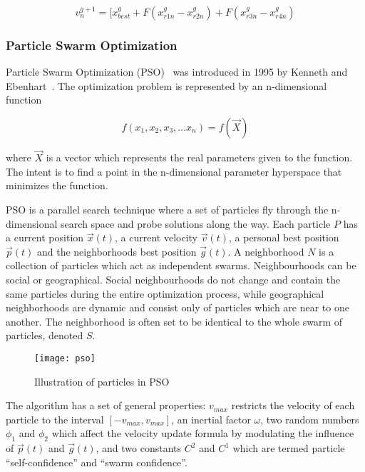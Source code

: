 \begin{equation}
v_{n}^{g+1} = [ x_{best}^{g} + F(x_{r1n}^{g} - x_{r2n}^{g}) + F(x_{r3n}^{g} - x_{r4n}^{g})
\end{equation}

\subsubsection{Particle Swarm Optimization}

Particle Swarm Optimization (PSO)~\cite{Das2008} was introduced in 1995 by Kenneth and Ebenhart~\cite{eberhart1995new}. The optimization problem is represented by an n-dimensional function

\begin{equation}
  f(x_1,x_2,x_3,...x_n) = f(\vec{X})
\end{equation}

where $\vec{X}$ is a vector which represents the real parameters given to the function. The intent is to find a point in the n-dimensional parameter hyperspace that minimizes the function.

PSO is a parallel search technique where a set of particles  fly through the n-dimensional search space and probe solutions along the way. Each particle $P$ has a current position $\vec{x}(t)$, a current velocity $\vec{v}(t)$, a personal best position $\vec{p}(t)$ and the neighborhoods best position $\vec{g}(t)$. A neighborhood $N$ is a collection of particles which act as independent swarms. Neighbourhoods can be social or geographical. Social neighbourhoods do not change and contain the same particles during the entire optimization process, while geographical neighborhoods are dynamic and consist only of particles which are near to one another. The neighborhood is often set to be identical to the whole swarm of particles, denoted $S$.

\begin{figure}[H]
  \centering
  \texttt{[image: pso]}
  \caption{Illustration of particles in PSO}
  \label{fig:pso}
\end{figure}

The algorithm has a set of general properties: $v_{max}$ restricts the velocity of each particle to the interval $[-v_{max},v_{max}]$, an inertial factor $\omega$, two random numbers $\phi_1$ and $\phi_2$ which affect the velocity update formula by modulating the influence of $\vec{p}(t)$ and $\vec{g}(t)$, and two constants $C^2$ and $C^1$ which are termed particle “self-confidence” and “swarm confidence”.

